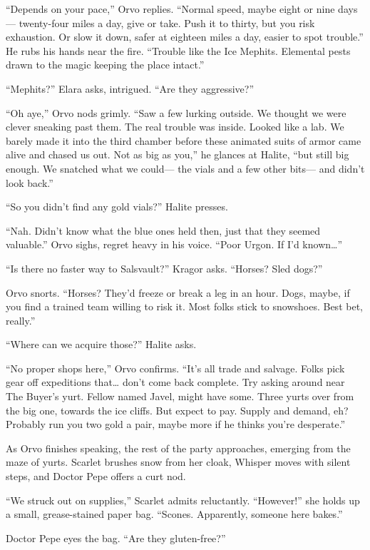 \documentclass[
  letterpaper,12pt,twoside,twocolumn,openany,
  nodeprecatedcode,bg=full]{dndbook}
\begin{document}
``Depends on your pace,'' Orvo replies. ``Normal speed, maybe eight or
nine days--- twenty-four miles a day, give or take. Push it to thirty,
but you risk exhaustion. Or slow it down, safer at eighteen miles a day,
easier to spot trouble.'' He rubs his hands near the fire. ``Trouble
like the Ice Mephits. Elemental pests drawn to the magic keeping the
place intact.''

``Mephits?'' Elara asks, intrigued. ``Are they aggressive?''

``Oh aye,'' Orvo nods grimly. ``Saw a few lurking outside. We thought we
were clever sneaking past them. The real trouble was inside. Looked like
a lab. We barely made it into the third chamber before these animated
suits of armor came alive and chased us out. Not as big as you,'' he
glances at Halite, ``but still big enough. We snatched what we could---
the vials and a few other bits--- and didn't look back.''

``So you didn't find any gold vials?'' Halite presses.

``Nah. Didn't know what the blue ones held then, just that they seemed
valuable.'' Orvo sighs, regret heavy in his voice. ``Poor Urgon. If I'd
known\ldots{}''

``Is there no faster way to Salsvault?'' Kragor asks. ``Horses? Sled
dogs?''

Orvo snorts. ``Horses? They'd freeze or break a leg in an hour. Dogs,
maybe, if you find a trained team willing to risk it. Most folks stick
to snowshoes. Best bet, really.''

``Where can we acquire those?'' Halite asks.

``No proper shops here,'' Orvo confirms. ``It's all trade and salvage.
Folks pick gear off expeditions that\ldots{} don't come back complete.
Try asking around near The Buyer's yurt. Fellow named Javel, might have
some. Three yurts over from the big one, towards the ice cliffs. But
expect to pay. Supply and demand, eh? Probably run you two gold a pair,
maybe more if he thinks you're desperate.''

As Orvo finishes speaking, the rest of the party approaches, emerging
from the maze of yurts. Scarlet brushes snow from her cloak, Whisper
moves with silent steps, and Doctor Pepe offers a curt nod.

``We struck out on supplies,'' Scarlet admits reluctantly. ``However!''
she holds up a small, grease-stained paper bag. ``Scones. Apparently,
someone here bakes.''

Doctor Pepe eyes the bag. ``Are they gluten-free?''
\end{document}
